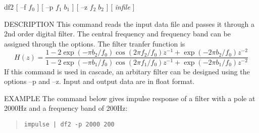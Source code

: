 
\begin{synopsis}
 \item[df2] [ --f $f_0$ ] [ --p $f_1 \; b_1$ ] [ --z $f_2 \; b_2$ ] 
	    [ {\em infile} ]
 \end{synopsis}

 \begin{qsection}{DESCRIPTION}
 This command reads the input data file and passes it through a 2nd
  order digital filter. The central frequency and frequency band can
  be assigned through the options.
  The filter tranfer function is
 \[
   H(z)=\frac{1-2\exp(-\pi b_2/f_0)\cos(2\pi f_2/f_0)z^{-1} +
	\exp(-2\pi b_2/f_0)z^{-2}}
   {1-2\exp(-\pi b_1/f_0)\cos(2\pi f_1/f_0)z^{-1}+\exp(-2\pi b_1/f_0)z^{-2}}
 \]
 If this command is used in cascade, an arbitary filter can be
 designed using the options --p and --z.
 Input and output data are in float format.
 \end{qsection}


\begin{qsection}{EXAMPLE}
The command below gives impulse response of a filter with
a pole at 2000Hz and a frequency band of 200Hz:
\begin{quote}
 \verb!impulse | df2 -p 2000 200 !
\end{quote}
\hspace{3cm}
\epsfxsize=4cm
\end{qsection}
